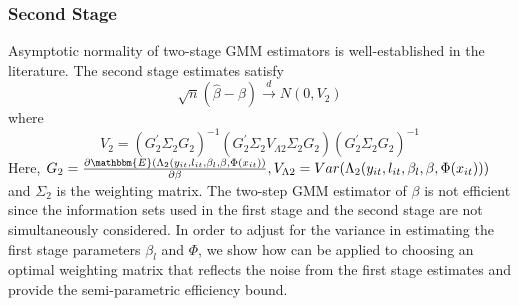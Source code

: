 \documentclass[11pt]{article}
\begin{document}
\subsubsection*{Second Stage}
Asymptotic normality of two-stage GMM estimators is well-established in the literature. The second stage estimates satisfy
\begin{equation}
\sqrt{n}(\hat{\beta}-\beta)\overset{d}{\operatorname{\rightarrow}}N(0,V_{2})
\end{equation}
where 
\begin{equation}
V_{2}=(G_{2}^{'}\Sigma_{2}G_{2})^{-1}(G_{2}^{'}\Sigma_{2}V_{\Lambda 2}\Sigma_{2}G_{2})(G_{2}^{'}\Sigma_{2}G_{2})^{-1}
\end{equation}
Here, $G_{2}=\frac{\partial \mathbbm{E}(\Lambda_{2}(y_{it}, l_{it}, \beta_{l}, \beta, \Phi(x_{it}))}{\partial \beta}, V_{\Lambda 2}=Var(\Lambda_{2}(y_{it}, l_{it}, \beta_{l}, \beta, \Phi(x_{it})))$ and $\Sigma_{2}$ is the weighting matrix. The two-step GMM estimator of $\beta$ is not efficient since the information sets used in the first stage and the second stage are not simultaneously considered. In order to adjust for the variance in estimating the first stage parameters $\beta_{l}$ and $\Phi$, we show how \cite{Ackerberg2014} can be applied to choosing an optimal weighting matrix that reflects the noise from the first stage estimates and provide the semi-parametric efficiency bound.\\
\end{document}

